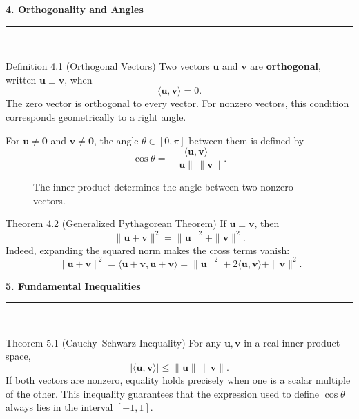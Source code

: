 \documentclass[11pt,letterpaper]{article}
\newcommand{\manualsection}[1]{%
  \Needspace{16\baselineskip}%
  \vspace{0.35cm}
  {\Large\bfseries\color{blackmain} #1}\\[2pt]
  {\color{orangeacc}\rule{\linewidth}{1.4pt}}\\[0.25cm]
}
\newcommand{\term}[1]{\textbf{\color{orangeacc}#1}}
\begin{document}
\manualsection{4. Orthogonality and Angles}

\begin{infobox}[blackmain]{Definition 4.1 (Orthogonal Vectors)}
Two vectors $\mathbf{u}$ and $\mathbf{v}$ are \term{orthogonal}, written
$\mathbf{u}\perp\mathbf{v}$, when
\begin{equation}
  \langle\mathbf{u},\mathbf{v}\rangle=0.
\end{equation}
The zero vector is orthogonal to every vector. For nonzero vectors, this condition
corresponds geometrically to a right angle.
\end{infobox}

For $\mathbf{u}\neq\mathbf{0}$ and $\mathbf{v}\neq\mathbf{0}$, the angle
$\theta\in[0,\pi]$ between them is defined by
\begin{equation}
  \cos\theta=
  \frac{\langle\mathbf{u},\mathbf{v}\rangle}
       {\|\mathbf{u}\|\,\|\mathbf{v}\|}.
\end{equation}

\begin{figure}[htbp]
\centering
{}
\caption{The inner product determines the angle between two nonzero vectors.}
\label{fig:vector-angle}
\end{figure}
\FloatBarrier

\begin{theorembox}{Theorem 4.2 (Generalized Pythagorean Theorem)}
If $\mathbf{u}\perp\mathbf{v}$, then
\begin{equation}
  \|\mathbf{u}+\mathbf{v}\|^2
  =\|\mathbf{u}\|^2+\|\mathbf{v}\|^2.
\end{equation}
Indeed, expanding the squared norm makes the cross terms vanish:
\[
\|\mathbf{u}+\mathbf{v}\|^2
=\langle\mathbf{u}+\mathbf{v},\mathbf{u}+\mathbf{v}\rangle
=\|\mathbf{u}\|^2+2\langle\mathbf{u},\mathbf{v}\rangle+\|\mathbf{v}\|^2.
\]
\end{theorembox}

\manualsection{5. Fundamental Inequalities}

\begin{theorembox}{Theorem 5.1 (Cauchy--Schwarz Inequality)}
For any $\mathbf{u},\mathbf{v}$ in a real inner product space,
\begin{equation}
  |\langle\mathbf{u},\mathbf{v}\rangle|
  \leq \|\mathbf{u}\|\,\|\mathbf{v}\|.
\end{equation}
If both vectors are nonzero, equality holds precisely when one is a scalar multiple
of the other. This inequality guarantees that the expression used to define
$\cos\theta$ always lies in the interval $[-1,1]$.
\end{theorembox}
\end{document}
